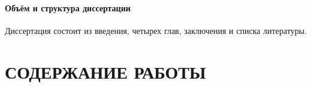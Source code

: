 \paragraph{Объём и структура диссертации}
Диссертация состоит из введения, четырех глав, заключения и списка литературы.

\section*{СОДЕРЖАНИЕ РАБОТЫ}





%





\newpage
